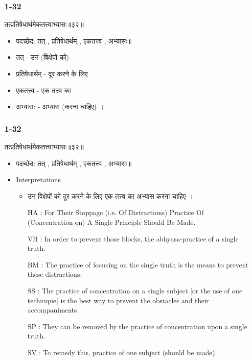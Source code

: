 \begin{frame}[fragile]\frametitle{1-32}
\begin{sanskrit}
तत्प्रतिषेधार्थमेकतत्त्वाभ्यासः॥३२॥
\end{sanskrit}

	\begin{itemize}
	\item पदच्छेद: तत् , प्रतिषेधार्थम् , एकतत्त्व , अभ्यासः॥
	\item तत् - उन (विक्षेपों को)
	\item प्रतिषेधार्थम् - दूर करने के लिए
	\item एकतत्त्व - एक तत्त्व का
	\item अभ्यास: - अभ्यास (करना चाहिए) ।

	\end{itemize}

\end{frame}

\begin{frame}[fragile]\frametitle{1-32}
\begin{sanskrit}
तत्प्रतिषेधार्थमेकतत्त्वाभ्यासः॥३२॥
\end{sanskrit}

	\begin{itemize}
	\item पदच्छेद: तत् , प्रतिषेधार्थम् , एकतत्त्व , अभ्यासः॥
	\item Interpretations
		\begin{itemize}	
		\item उन विक्षेपों को दूर करने के लिए एक तत्त्व का अभ्यास करना चाहिए ।
		\item [HA]: For Their Stoppage (i.e. Of Distractions) Practice Of (Concentration on) A Single Principle Should Be Made.
		\item [VH]: In order to prevent those blocks, the abhyasa-practice of a single truth.
		\item [BM]: The practice of focusing on the single truth is the means to prevent these distractions.
		\item [SS]: The practice of concentration on a single subject [or the use of one technique] is the best way to prevent the obstacles and their accompaniments.
		\item [SP]: They can be removed by the practice of concentration upon a single truth.
		\item [SV]: To remedy this, practice of one subject (should be made). 
		\end{itemize}
	\end{itemize}

\end{frame}


